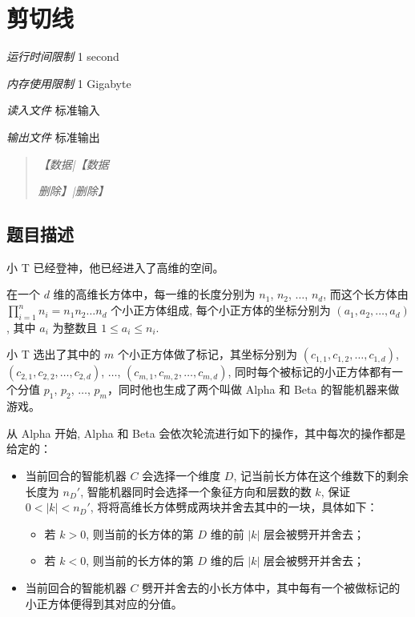 \section[H. 剪切线]{ 剪切线}

\textit{运行时间限制}   1 second

\textit{内存使用限制} 1 Gigabyte

\textit{读入文件} \qquad 标准输入

\textit{输出文件} \qquad 标准输出

\begin{quote}
   \textit{【数据|【数据}

   \textit{删除】|删除】}
\end{quote}


\subsection{题目描述}

小 T 已经登神，他已经进入了高维的空间。

在一个 $d$ 维的高维长方体中，每一维的长度分别为 $n_1$, $n_2$, $\ldots$, $n_d$, 而这个长方体由 $\prod_{i=1}^{n} n_i = n_1n_2\ldots n_d$ 个小正方体组成, 每个小正方体的坐标分别为 $(a_1, a_2, \ldots, a_{d})$, 其中 $a_i$ 为整数且 $1 \le a_i \le n_i$.

小 T 选出了其中的 $m$ 个小正方体做了标记，其坐标分别为 $(c_{1, 1}, c_{1, 2}, \ldots, c_{1, d})$, $(c_{2, 1}, c_{2, 2}, \ldots, c_{2, d})$, $\ldots$, $(c_{m, 1}, c_{m, 2}, \ldots, c_{m, d})$, 同时每个被标记的小正方体都有一个分值 $p_1$, $p_2$, $\ldots$, $p_m$，同时他也生成了两个叫做 Alpha 和 Beta 的智能机器来做游戏。

从 Alpha 开始, Alpha 和 Beta 会依次轮流进行如下的操作，其中每次的操作都是给定的：

\begin{itemize}
   \item 当前回合的智能机器 $C$ 会选择一个维度 $D$,  记当前长方体在这个维数下的剩余长度为 $n_D'$, 智能机器同时会选择一个象征方向和层数的数 $k$, 保证 $0 < |k| < n_D'$,  将将高维长方体劈成两块并舍去其中的一块，具体如下：
   \begin{itemize}
      \item 若 $k > 0$, 则当前的长方体的第 $D$ 维的前 $|k|$ 层会被劈开并舍去；
      \item 若 $k < 0$, 则当前的长方体的第 $D$ 维的后 $|k|$ 层会被劈开并舍去；
   \end{itemize}
   \item 当前回合的智能机器 $C$ 劈开并舍去的小长方体中，其中每有一个被做标记的小正方体便得到其对应的分值。
\end{itemize}

